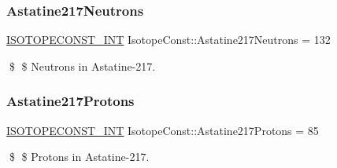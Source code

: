 \subsubsection{\texorpdfstring{Astatine217\+Neutrons}{Astatine217Neutrons}}
{\footnotesize\ttfamily \mbox{\hyperlink{group___isotope_const-_macros_ga5f18360b3e99483a35c32d789e62621c}{I\+S\+O\+T\+O\+P\+E\+C\+O\+N\+S\+T\+\_\+\+I\+NT}} Isotope\+Const\+::\+Astatine217\+Neutrons = 132}

\$ \$ Neutrons in Astatine-\/217. \mbox{\label{group___isotope_const-_astatine-_at217_gaf42a79eec645ea3821e465e8d22046e3}} 
\subsubsection{\texorpdfstring{Astatine217\+Protons}{Astatine217Protons}}
{\footnotesize\ttfamily \mbox{\hyperlink{group___isotope_const-_macros_ga5f18360b3e99483a35c32d789e62621c}{I\+S\+O\+T\+O\+P\+E\+C\+O\+N\+S\+T\+\_\+\+I\+NT}} Isotope\+Const\+::\+Astatine217\+Protons = 85}

\$ \$ Protons in Astatine-\/217. 